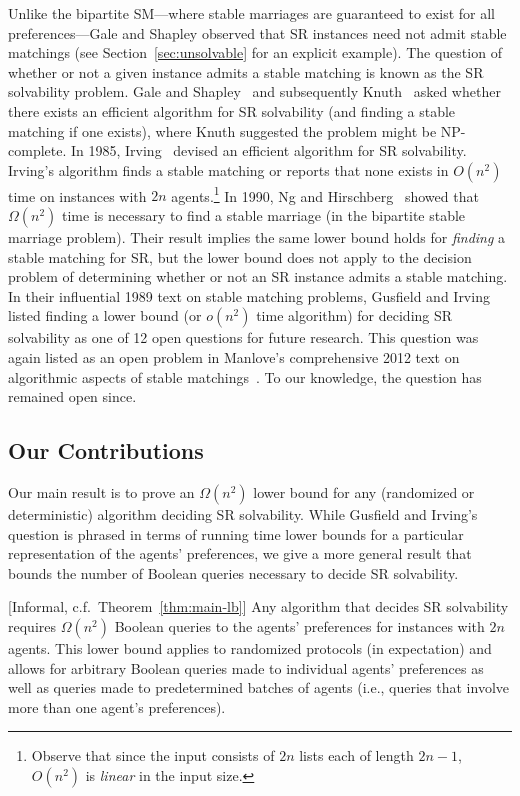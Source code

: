 Unlike the bipartite SM---where stable marriages are guaranteed to exist for all preferences---Gale and Shapley observed that SR instances need not admit stable matchings (see Section~\ref{sec:unsolvable} for an explicit example). The question of whether or not a given instance admits a stable matching is known as the SR solvability problem. Gale and Shapley~\cite{GS62} and subsequently Knuth~\cite{Knuth76} asked whether there exists an efficient algorithm for SR solvability (and finding a stable matching if one exists), where Knuth suggested the problem might be NP-complete. In 1985, Irving~\cite{Irving1985-stable} devised an efficient algorithm for SR solvability. Irving's algorithm finds a stable matching or reports that none exists in $O(n^2)$ time on instances with $2n$ agents.\footnote{Observe that since the input consists of $2n$ lists each of length $2n - 1$, $O(n^2)$ is \emph{linear} in the input size.} In 1990, Ng and Hirschberg~\cite{HN90} showed that $\Omega(n^2)$ time is necessary to find a stable marriage (in the bipartite stable marriage problem). Their result implies the same lower bound holds for \emph{finding} a stable matching for SR, but the lower bound does not apply to the decision problem of determining whether or not an SR instance admits a stable matching. In their influential 1989 text on stable matching problems, Gusfield and Irving~\cite{GI89} listed finding a lower bound (or $o(n^2)$ time algorithm) for deciding SR solvability as one of 12 open questions for future research. This question was again listed as an open problem in Manlove's comprehensive 2012 text on algorithmic aspects of stable matchings~\cite{Manlove2013-algorithmics}. To our knowledge, the question has remained open since.

\subsection{Our Contributions}

 Our main result is to prove an $\Omega(n^2)$ lower bound for any (randomized or deterministic) algorithm deciding SR solvability. While Gusfield and Irving's question is phrased in terms of running time lower bounds for a particular representation of the agents' preferences, we give a more general result that bounds the number of Boolean queries necessary to decide SR solvability.

\begin{thm}\label{thm:informal}[Informal, c.f.\ Theorem~\ref{thm:main-lb}]
    Any algorithm that decides SR solvability requires $\Omega(n^2)$ Boolean queries to the agents' preferences for instances with $2n$ agents. This lower bound applies to randomized protocols (in expectation) and allows for arbitrary Boolean queries made to individual agents' preferences as well as queries made to predetermined batches of agents (i.e., queries that involve more than one agent's preferences).
\end{thm}

